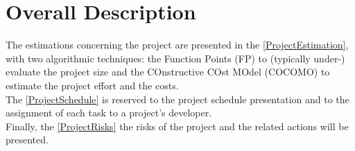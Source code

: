 \documentclass[\mainpath/main]{subfiles}
\begin{document}
\section{Overall Description}
\label{Introduction:Overall}
The estimations concerning the project are presented in the \autoref{ProjectEstimation}, with two algorithmic techniques: the Function Points (FP) to (typically under-) evaluate the project size and the COnstructive COst MOdel (COCOMO) to estimate the project effort and the costs.\\
The \autoref{ProjectSchedule} is reserved to the project schedule presentation and to the assignment of each task to a project's developer.\\
Finally, the \autoref{ProjectRisks} the risks of the project and the related actions will be presented.
\end{document}
